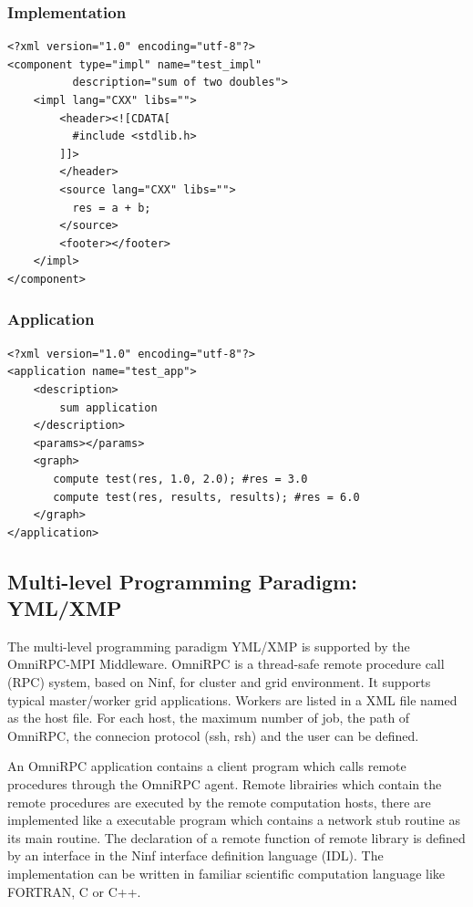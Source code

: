 \subsubsection{Implementation}

\lstset{language=XML}
\begin{lstlisting}[frame=single]
<?xml version="1.0" encoding="utf-8"?>
<component type="impl" name="test_impl"
          description="sum of two doubles">
    <impl lang="CXX" libs="">
        <header><![CDATA[
          #include <stdlib.h>
        ]]>
        </header>
        <source lang="CXX" libs="">
          res = a + b;
        </source>
        <footer></footer>
    </impl>
</component>
\end{lstlisting}

\subsubsection{Application}

\lstset{language=XML}
\begin{lstlisting}[frame=single]
<?xml version="1.0" encoding="utf-8"?>
<application name="test_app">
    <description>
        sum application
    </description>
    <params></params>
    <graph>
       compute test(res, 1.0, 2.0); #res = 3.0
       compute test(res, results, results); #res = 6.0
    </graph>
</application>
\end{lstlisting}

\subsection{Multi-level Programming Paradigm: YML/XMP}

The multi-level programming paradigm YML/XMP is supported by the OmniRPC-MPI Middleware. OmniRPC is a thread-safe remote procedure call (RPC) system, based on Ninf, for cluster and grid environment. It supports typical master/worker grid applications. Workers are listed in a XML file named as the host file. For each host, the maximum number of job, the path of OmniRPC, the connecion protocol (ssh, rsh) and the user can be defined.

An OmniRPC application contains a client program which calls remote procedures through the OmniRPC agent. Remote librairies which contain the remote procedures are executed by the remote computation hosts, there are implemented like a executable program which contains a network stub routine as its main routine. The declaration of a remote function of remote library is defined by an interface in the Ninf interface definition language (IDL). The implementation can be written in familiar scientific computation language like FORTRAN, C or C++.

